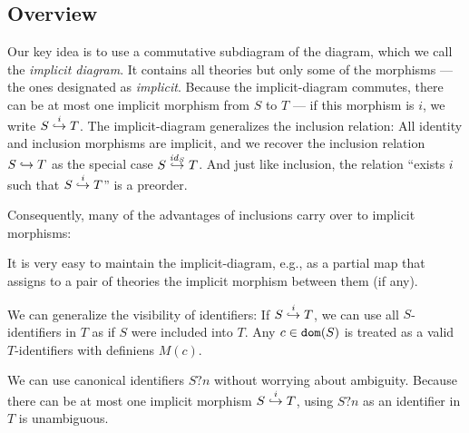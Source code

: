 \subsection{Overview}

Our key idea is to use a commutative subdiagram of the \mmt diagram, which we call the \emph{implicit diagram}.
It contains all theories but only some of the morphisms --- the ones designated as \emph{implicit}.
Because the implicit-diagram commutes, there can be at most one implicit morphism from $S$ to $T$ --- if this morphism is $i$, we write $\ipc{i}{S}{T}$.
The implicit-diagram generalizes the inclusion relation:
All identity and inclusion morphisms are implicit, and we recover the inclusion relation $S\harr T$ as the special case $\ipc{\id{S}}{S}{T}$.
And just like inclusion, the relation ``exists $i$ such that $\ipc{i}{S}{T}$'' is a preorder.

Consequently, many of the advantages of inclusions carry over to implicit morphisms:
\begin{compactitem}
\item It is very easy to maintain the implicit-diagram, e.g., as a partial map that assigns to a pair of theories the implicit morphism between them (if any).
\item We can generalize the visibility of identifiers: If $\ipc{i}{S}{T}$, we can use all $S$-identifiers in $T$ as if $S$ were included into $T$.
Any $c\in\dom{S}$ is treated as a valid $T$-identifiers with definiens $M(c)$.
\item We can use canonical identifiers $S?n$ without worrying about ambiguity. Because there can be at most one implicit morphism $\ipc{i}{S}{T}$, using $S?n$ as an identifier in $T$ is unambiguous.
\end{compactitem}


